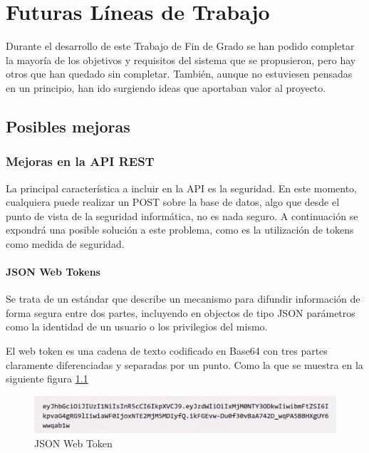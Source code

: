 \chapter{Futuras Líneas de Trabajo}

Durante el desarrollo de este Trabajo de Fin de Grado se han podido completar la mayoría de los objetivos y requisitos del sistema que se propusieron, pero hay otros que han quedado sin completar. También, aunque no estuviesen pensadas en un principio, han ido surgiendo ideas que aportaban valor al proyecto.

\section{Posibles mejoras}

\subsection{Mejoras en la API REST}

La principal característica a incluir en la API es la seguridad. En este momento, cualquiera puede realizar un POST sobre la base de datos, algo que desde el punto de vista de la seguridad informática, no es nada seguro. A continuación se expondrá una posible solución a este problema, como es la utilización de tokens como medida de seguridad.

\subsubsection{JSON Web Tokens}

Se trata de un estándar que describe un mecanismo para difundir información de forma segura entre dos partes, incluyendo en objectos de tipo JSON parámetros como la identidad de un usuario o los privilegios del mismo.

El web token es una cadena de texto codificado en Base64 \cite{josefsson2006base16} con tres partes claramente diferenciadas y separadas por un punto. Como la que se muestra en la siguiente figura \ref{fig:JWT}

\begin{figure}[H]
    \centering
    \includegraphics[width=\textwidth]{include/figuras/JWT.jpg}
    \caption{JSON Web Token}
    \label{fig:JWT}
\end{figure}

